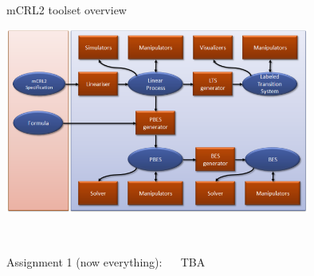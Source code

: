 \documentclass[aspectratio=169]{beamer}
\begin{document}
\begin{slide}{mCRL2 toolset overview}
  \centering
  
  \includegraphics[width=0.75\textwidth]{images/mcrl2-toolset.png}
  
  \\[-10mm]
  \begin{block}{}\centering
    Assignment 1 (now everything): ~~ TBA

  \end{block}
\end{slide}
\end{document}

